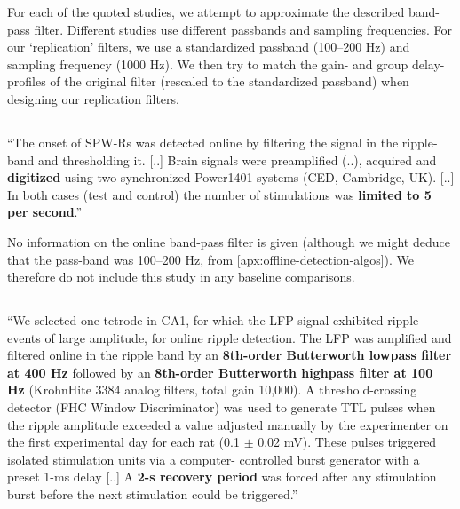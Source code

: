 For each of the quoted studies, we attempt to approximate the described band-pass filter. Different studies use different passbands and sampling frequencies. For our `replication' filters, we use a standardized passband (100--200 Hz) and sampling frequency (1000 Hz). We then try to match the gain- and group delay-profiles of the original filter (rescaled to the standardized passband) when designing our replication filters.


\subsection{}

\begin{quotebar}
``The onset of SPW-Rs was detected online by filtering the signal in the ripple-band and thresholding it. [..] Brain signals were preamplified (..), acquired and \textbf{digitized} using two synchronized Power1401 systems (CED, Cambridge, UK). [..] In both cases (test and control) the number of stimulations was \textbf{limited to 5 per second}.'' \cite{Girardeau2009}
\end{quotebar}

No information on the online band-pass filter is given (although we might deduce that the pass-band was 100--200 Hz, from \cref{apx:offline-detection-algos}). We therefore do not include this study in any baseline comparisons.


\subsection{}

\begin{quotebar}
``We selected one tetrode in CA1, for which the LFP signal exhibited ripple events of large amplitude, for online ripple detection. The LFP was amplified and filtered online in the ripple band by an \textbf{8th-order Butterworth lowpass filter at 400 Hz} followed by an \textbf{8th-order Butterworth highpass filter at 100 Hz} (KrohnHite 3384 analog filters, total gain 10,000). A threshold-crossing detector (FHC Window Discriminator) was used to generate TTL pulses when the ripple amplitude exceeded a value adjusted manually by the experimenter on the first experimental day for each rat (0.1 $\pm$ 0.02 mV). These pulses triggered isolated stimulation units via a computer- controlled burst generator with a preset 1-ms delay [..] A \textbf{2-s recovery period} was forced after any stimulation burst before the next stimulation could be triggered.'' \cite{Ego-Stengel2009}
\end{quotebar}

